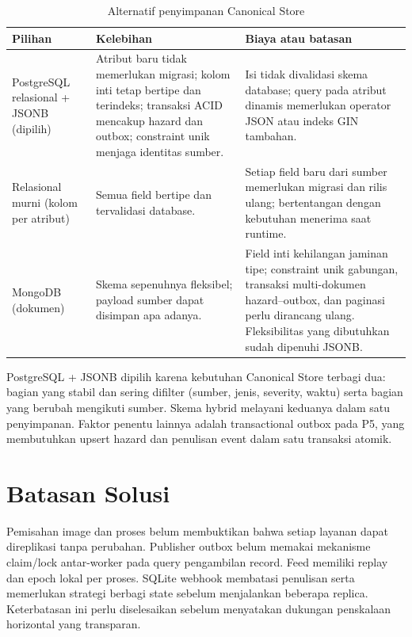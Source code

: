 \begin{table}[htbp]
    \centering
    \small
    \caption{Alternatif penyimpanan Canonical Store}
    \begin{tabularx}{\textwidth}{@{}P{0.21\textwidth}X X@{}}
        \toprule
        \textbf{Pilihan} & \textbf{Kelebihan} & \textbf{Biaya atau batasan} \\
        \midrule
        PostgreSQL relasional + JSONB (dipilih) & Atribut baru tidak memerlukan migrasi; kolom inti tetap bertipe dan terindeks; transaksi ACID mencakup hazard dan outbox; constraint unik menjaga identitas sumber. & Isi  tidak divalidasi skema database; query pada atribut dinamis memerlukan operator JSON atau indeks GIN tambahan. \\
        Relasional murni (kolom per atribut) & Semua field bertipe dan tervalidasi database. & Setiap field baru dari sumber memerlukan migrasi  dan rilis ulang; bertentangan dengan kebutuhan menerima  saat runtime. \\
        MongoDB (dokumen) & Skema sepenuhnya fleksibel; payload sumber dapat disimpan apa adanya. & Field inti kehilangan jaminan tipe; constraint unik gabungan, transaksi multi-dokumen hazard--outbox, dan paginasi perlu dirancang ulang. Fleksibilitas yang dibutuhkan sudah dipenuhi JSONB. \\
        \bottomrule
    \end{tabularx}
\end{table}

PostgreSQL + JSONB dipilih karena kebutuhan Canonical Store terbagi dua:
bagian yang stabil dan sering difilter (sumber, jenis, severity, waktu) serta
bagian yang berubah mengikuti sumber. Skema hybrid melayani keduanya dalam satu
penyimpanan. Faktor penentu lainnya adalah transactional outbox pada P5, yang
membutuhkan upsert hazard dan penulisan event dalam satu transaksi atomik.

\section{Batasan Solusi}

Pemisahan image dan proses belum membuktikan bahwa setiap layanan dapat
direplikasi tanpa perubahan. Publisher outbox belum memakai mekanisme
claim/lock antar-worker pada query pengambilan record. Feed memiliki replay
dan epoch lokal per proses. SQLite webhook membatasi penulisan serta
memerlukan strategi berbagi state sebelum menjalankan beberapa replica.
Keterbatasan ini perlu diselesaikan sebelum menyatakan dukungan penskalaan
horizontal yang transparan.

